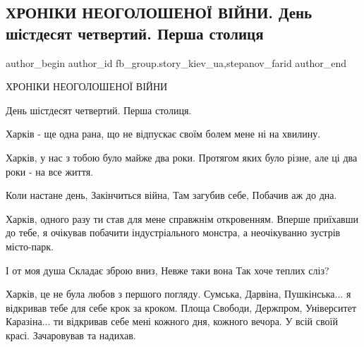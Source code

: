  
 
 
 
 
 
\subsection{ХРОНІКИ НЕОГОЛОШЕНОЇ ВІЙНИ. День шістдесят четвертий. Перша столиця}
\label{sec:29_04_2022.fb.fb_group.story_kiev_ua.1.hronika_harkov}
 
\ifcmt
 author_begin
   author_id fb_group.story_kiev_ua,stepanov_farid
 author_end
\fi


ХРОНІКИ НЕОГОЛОШЕНОЇ ВІЙНИ 

День шістдесят четвертий. Перша столиця. 

Харків - ще одна рана, що не відпускає своїм болем мене ні на хвилину. 


Харків, у нас з тобою було майже два роки. Протягом яких було різне, але ці два
роки - на все життя. 

\obeycr
\noindent 
Коли настане день,
Закінчиться війна,
Там загубив себе,
Побачив аж до дна.
\restorecr

Харків, одного разу ти став для мене справжнім откровенням. Вперше приїхавши
до тебе, я очікував побачити індустріального монстра, а неочікуванно зустрів
місто-парк.


\obeycr
\noindent 
І от моя душа
Складає зброю вниз,
Невже таки вона
Так хоче теплих сліз?
\restorecr


Харків, це не була любов з першого погляду. Сумська, Дарвіна, Пушкінська... я
відкривав тебе для себе крок за кроком. Площа Свободи, Держпром, Університет
Каразіна... ти відкривав себе мені кожного дня, кожного вечора. У всій своїй
красі. Зачаровував та надихав. 

